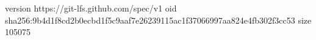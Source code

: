 version https://git-lfs.github.com/spec/v1
oid sha256:9b4d1f8cd2b0ecbd1f5c9aaf7e26239115ac1f37066997aa824e4fb302f3cc53
size 105075
